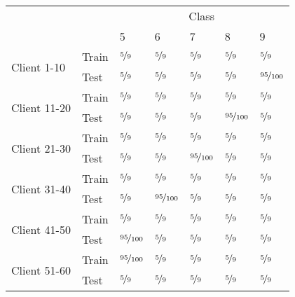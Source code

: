 \begin{tabular}{lllllll}
\toprule
              &      & \multicolumn{5}{c}{Class} \\
              &      & 5 & 6 & 7 & 8 & 9 \\
\midrule
\multirow{2}{*}{Client 1-10} & Train & $\nicefrac{{5}}{{9}}$ & $\nicefrac{{5}}{{9}}$ & $\nicefrac{{5}}{{9}}$ & $\nicefrac{{5}}{{9}}$ & $\nicefrac{{5}}{{9}}$ \\
              & Test & $\nicefrac{{5}}{{9}}$ & $\nicefrac{{5}}{{9}}$ & $\nicefrac{{5}}{{9}}$ & $\nicefrac{{5}}{{9}}$ &  $\nicefrac{{95}}{{100}}$ \\
\cline{1-7}
\multirow{2}{*}{Client 11-20} & Train & $\nicefrac{{5}}{{9}}$ & $\nicefrac{{5}}{{9}}$ & $\nicefrac{{5}}{{9}}$ & $\nicefrac{{5}}{{9}}$ & $\nicefrac{{5}}{{9}}$ \\
              & Test & $\nicefrac{{5}}{{9}}$ & $\nicefrac{{5}}{{9}}$ & $\nicefrac{{5}}{{9}}$ &  $\nicefrac{{95}}{{100}}$ & $\nicefrac{{5}}{{9}}$ \\
\cline{1-7}
\multirow{2}{*}{Client 21-30} & Train &  $\nicefrac{{5}}{{9}}$ &  $\nicefrac{{5}}{{9}}$ &  $\nicefrac{{5}}{{9}}$ &  $\nicefrac{{5}}{{9}}$ &  $\nicefrac{{5}}{{9}}$ \\
                  & Test  &  $\nicefrac{{5}}{{9}}$ &  $\nicefrac{{5}}{{9}}$ &  $\nicefrac{{95}}{{100}}$ &  $\nicefrac{{5}}{{9}}$ &  $\nicefrac{{5}}{{9}}$ \\
\cline{1-7}
\multirow{2}{*}{Client 31-40} & Train &  $\nicefrac{{5}}{{9}}$ &  $\nicefrac{{5}}{{9}}$ &  $\nicefrac{{5}}{{9}}$ &  $\nicefrac{{5}}{{9}}$ &  $\nicefrac{{5}}{{9}}$ \\
                  & Test  &  $\nicefrac{{5}}{{9}}$ &  $\nicefrac{{95}}{{100}}$ &  $\nicefrac{{5}}{{9}}$ &  $\nicefrac{{5}}{{9}}$ &  $\nicefrac{{5}}{{9}}$ \\
\cline{1-7}
\multirow{2}{*}{Client 41-50} & Train &  $\nicefrac{{5}}{{9}}$ &  $\nicefrac{{5}}{{9}}$ &  $\nicefrac{{5}}{{9}}$ &  $\nicefrac{{5}}{{9}}$ &  $\nicefrac{{5}}{{9}}$ \\
                  & Test  &   $\nicefrac{{95}}{{100}}$ &  $\nicefrac{{5}}{{9}}$ &  $\nicefrac{{5}}{{9}}$ &  $\nicefrac{{5}}{{9}}$ &  $\nicefrac{{5}}{{9}}$ \\
\cline{1-7}
\multirow{2}{*}{Client 51-60} & Train &  $\nicefrac{{95}}{{100}}$ &  $\nicefrac{{5}}{{9}}$ &  $\nicefrac{{5}}{{9}}$ &  $\nicefrac{{5}}{{9}}$ &  $\nicefrac{{5}}{{9}}$ \\
                  & Test  &  $\nicefrac{{5}}{{9}}$ &  $\nicefrac{{5}}{{9}}$ &  $\nicefrac{{5}}{{9}}$ &  $\nicefrac{{5}}{{9}}$ &  $\nicefrac{{5}}{{9}}$ \\

\end{tabular}
